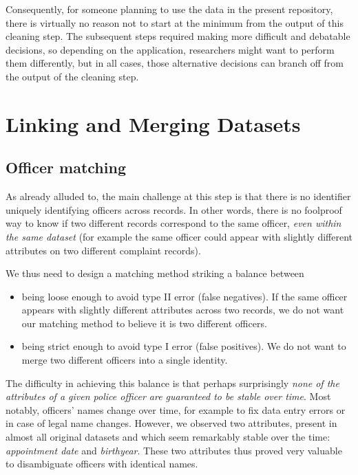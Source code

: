 \documentclass{article}
\begin{document}
Consequently, for someone planning to use the data in the present repository,
there is virtually no reason not to start at the minimum from the output of
this cleaning step. The subsequent steps required making more difficult and
debatable decisions, so depending on the application, researchers might want to
perform them differently, but in all cases, those alternative decisions can
branch off from the output of the cleaning step.

\section{Linking and Merging Datasets}\label{sec:linking}

\subsection{Officer matching}

As already alluded to, the main challenge at this step is that there is no
identifier uniquely identifying officers across records. In other words, there
is no foolproof way to know if two different records correspond to the same
officer, \emph{even within the same dataset} (for example the same officer
could appear with slightly different attributes on two different complaint
records).

We thus need to design a matching method striking a balance between
\begin{itemize}
	\item being loose enough to avoid type II error (false negatives). If the
		same officer appears with slightly different attributes across two
		records, we do not want our matching method to believe it is two
		different officers.
	\item being strict enough to avoid type I error (false positives). We do
		not want to merge two different officers into a single identity.
\end{itemize}

The difficulty in achieving this balance is that perhaps surprisingly
\emph{none of the attributes of a given police officer are guaranteed to be
stable over time}. Most notably, officers' names change over time, for example
to fix data entry errors or in case of legal name changes. However, we observed
two attributes, present in almost all original datasets and which seem
remarkably stable over the time: \emph{appointment date} and \emph{birthyear}.
These two attributes thus proved very valuable to disambiguate officers with
identical names.
\end{document}
